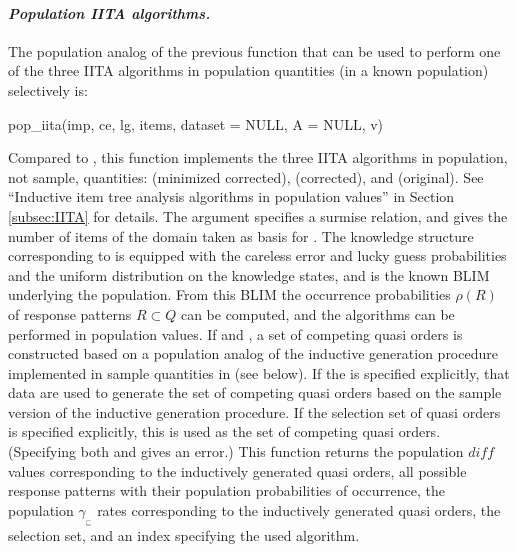 \documentclass[nojss]{jss}
\begin{document}
\paragraph{\it Population IITA algorithms.}
The population analog of the previous function that can be used to perform one of the three IITA algorithms in population quantities (in a known population) selectively is:
\begin{Code}
pop_iita(imp, ce, lg, items, dataset = NULL, A = NULL, v)
\end{Code}
Compared to , this function implements the three IITA algorithms in population, not sample, quantities:
 (minimized corrected),  (corrected), and  (original). 
See ``Inductive item tree analysis algorithms in population values'' in Section \ref{subsec:IITA}
for details.
The argument  specifies a surmise relation, and  gives the number of items of the domain taken as basis for . 
The knowledge structure corresponding to  is equipped 
with the careless error  and lucky guess  probabilities and the uniform distribution on the knowledge states, and is the known BLIM underlying the population. 
From this BLIM the occurrence probabilities $\rho(R)$ of response patterns $R\subset Q$ can be computed, and the algorithms can be performed in population values. 
If  and , a set of competing quasi orders is constructed based on a population analog of the inductive generation procedure implemented in sample quantities 
in  (see below). If the  is specified explicitly, that data are used 
to generate the set of competing quasi orders based on the sample version of the inductive generation procedure. If the selection set  of quasi orders is specified explicitly, 
this is used as the set of competing quasi orders. (Specifying both  and  
gives an error.) This function returns the population $\mathit{diff}$ values corresponding to the inductively generated quasi orders, 
all possible response patterns with their population probabilities of occurrence,
the population $\gamma_{_\sqsubseteq}$ rates corresponding to the inductively generated quasi orders, the selection set, and an index specifying the used algorithm.
\end{document}
